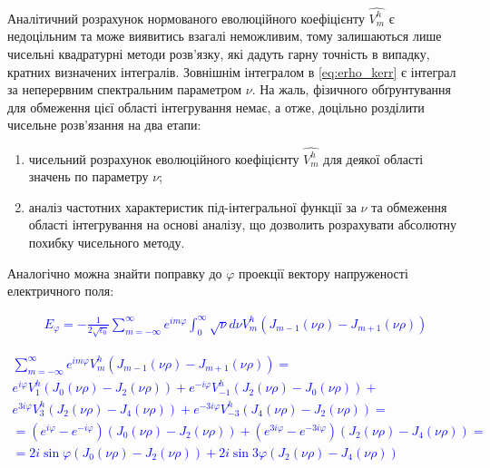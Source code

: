 Аналітичний розрахунок нормованого еволюційного коефіцієнту $ \hat{V_m^h} $
є недоцільним та може виявитись взагалі неможливим, тому залишаються лише
чисельні квадратурні методи розв'язку, які дадуть гарну точність в випадку,
кратних визначених інтегралів. Зовнішнім інтегралом в \eqref{eq:erho_kerr} є 
інтеграл за неперервним спектральним параметром $ \nu $. На жаль, фізичного
обґрунтування для обмеження цієї області інтегрування немає, а отже,
доцільно розділити чисельне розв'язання на два етапи:

\begin{enumerate}
	\item чисельний розрахунок еволюційного коефіцієнту $ \hat{V_m^h} $ 
	для деякої області значень по параметру $ \nu $;
	\item аналіз частотних характеристик під-інтегральної функції за $ \nu $ 
	та обмеження області інтегрування на основі аналізу, що дозволить 
	розрахувати абсолютну похибку чисельного методу.
\end{enumerate}

Аналогічно можна знайти поправку до $ \varphi $ проекції вектору 
напруженості електричного поля:

\textcolor{blue} { \begin{equation*} \begin{aligned}
E_\varphi = - \frac{1}{2 \sqrt{\epsilon_0}} \sum_{m=-\infty}^{\infty} 
e^{im\varphi} \int_{0}^{\infty} \sqrt{\nu} d \nu 
V_m^h \left( J_{m-1} (\nu \rho) - J_{m+1} (\nu \rho) \right)
\end{aligned} \end{equation*} }

\textcolor{blue} { \begin{equation*} \begin{aligned}
\sum_{m=-\infty}^\infty e^{im \varphi}
V_m^h \left( J_{m-1} (\nu \rho) - J_{m+1} (\nu \rho) \right) = \\
e^{  i \varphi} V_{ 1}^h \left( J_0 (\nu \rho) - J_2 (\nu \rho) \right) +
e^{- i \varphi} V_{-1}^h \left( J_2 (\nu \rho) - J_0 (\nu \rho) \right) + \\
e^{ 3i \varphi} V_{ 3}^h \left( J_2 (\nu \rho) - J_4 (\nu \rho) \right) +
e^{-3i \varphi} V_{-3}^h \left( J_4 (\nu \rho) - J_2 (\nu \rho) \right) = \\
= \left( e^{  i \varphi} - e^{- i \varphi} \right)
\left( J_0 (\nu \rho) - J_2 (\nu \rho) \right) +
\left( e^{ 3i \varphi} - e^{-3i \varphi} \right) 
\left( J_2 (\nu \rho) - J_4 (\nu \rho) \right) = \\
= 2i \sin \varphi \left( J_0 (\nu \rho) - J_2 (\nu \rho) \right) +
2i \sin 3 \varphi \left( J_2 (\nu \rho) - J_4 (\nu \rho) \right)
\end{aligned} \end{equation*} }

